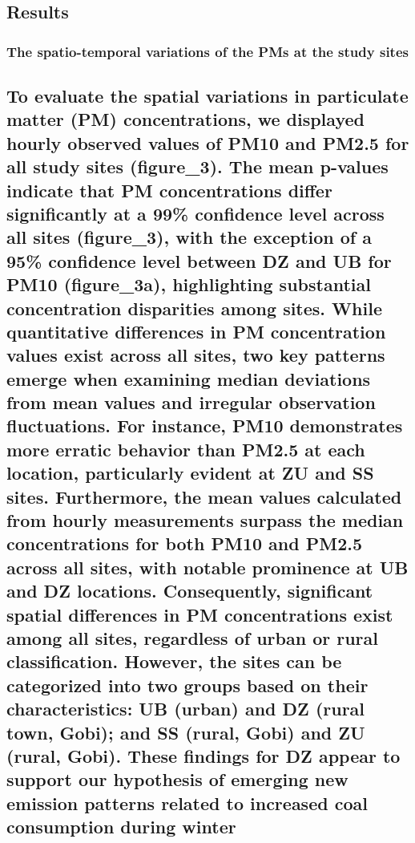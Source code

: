\documentclass[
  11pt,
]{article}
\begin{document}
\subsection{Results}\label{results}

\subsubsection{The spatio-temporal variations of the PMs at the study
sites}\label{the-spatio-temporal-variations-of-the-pms-at-the-study-sites}

\subsection{To evaluate the spatial variations in particulate matter
(PM) concentrations, we displayed hourly observed values of PM10 and
PM2.5 for all study sites (figure\_3). The mean p-values indicate that
PM concentrations differ significantly at a 99\% confidence level across
all sites (figure\_3), with the exception of a 95\% confidence level
between DZ and UB for PM10 (figure\_3a), highlighting substantial
concentration disparities among sites. While quantitative differences in
PM concentration values exist across all sites, two key patterns emerge
when examining median deviations from mean values and irregular
observation fluctuations. For instance, PM10 demonstrates more erratic
behavior than PM2.5 at each location, particularly evident at ZU and SS
sites. Furthermore, the mean values calculated from hourly measurements
surpass the median concentrations for both PM10 and PM2.5 across all
sites, with notable prominence at UB and DZ locations. Consequently,
significant spatial differences in PM concentrations exist among all
sites, regardless of urban or rural classification. However, the sites
can be categorized into two groups based on their characteristics: UB
(urban) and DZ (rural town, Gobi); and SS (rural, Gobi) and ZU (rural,
Gobi). These findings for DZ appear to support our hypothesis of
emerging new emission patterns related to increased coal consumption
during winter
}
\end{document}
